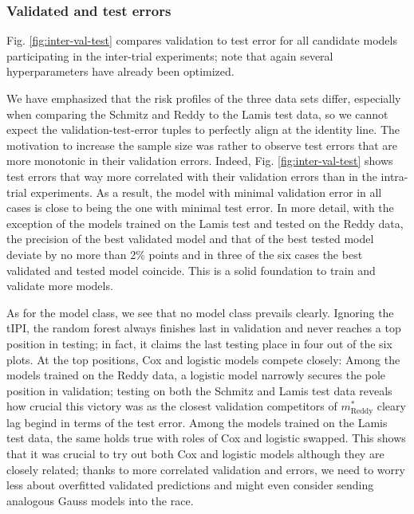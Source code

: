 \subsubsection{Validated and test errors}



Fig. \ref{fig:inter-val-test} compares validation to test error for all candidate models 
participating in the inter-trial experiments; note that again several hyperparameters have already 
been optimized. 

We have emphasized that the risk profiles of the three data sets differ, especially when comparing 
the Schmitz and Reddy to the Lamis test data, so we cannot expect the validation-test-error tuples 
to perfectly align at the identity line. The motivation to increase the sample size was rather 
to observe test errors that are more monotonic in their validation errors. Indeed, Fig. 
\ref{fig:inter-val-test} shows test errors that way more correlated with their validation errors 
than in the intra-trial experiments. As a result, the model with minimal validation error in all 
cases is close to being the one with minimal test error. In more detail, with the exception of 
the models trained on the Lamis test and tested on the Reddy data, the precision of the best 
validated model and that of the best tested model deviate by no more than \num{2}\% points and in 
three of the six cases the best validated and tested model coincide. This is a solid foundation 
to train and validate more models.

As for the model class, we see that no model class prevails clearly. Ignoring the tIPI, the random 
forest always finishes last in validation and never reaches a top position in testing; in fact, 
it claims the last testing place in four out of the six plots. At the top positions, Cox and 
logistic models compete closely: Among the models trained on the Reddy data, a logistic model 
narrowly secures the pole position in validation; testing on both the Schmitz and Lamis test 
data reveals how crucial this victory was as the closest validation competitors of 
$m^*_\text{Reddy}$ cleary lag begind in terms of the test error. Among the models trained on the 
Lamis test data, the same holds true with roles of Cox and logistic swapped. This shows that it 
was crucial to try out both Cox and logistic models although they are closely related; thanks to 
more correlated validation and errors, we need to worry less about overfitted validated 
predictions and might even consider sending analogous Gauss models into the race.

